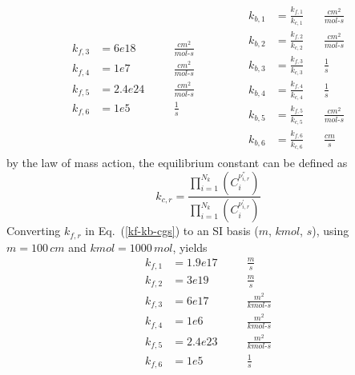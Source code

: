 \documentclass[a4paper]{report}
\newcommand{\eref}[1]{Eq.~(\ref{#1})}
\newcommand{\kf}[1]{k_{f,#1}}
\newcommand{\kb}[1]{k_{b,#1}}
\newcommand{\kcf}[1]{\frac{k_{f,#1}}{k_{c,#1}}}
\begin{document}
\begin{enumerate}
\begin{align}
\begin{alignedat}{2}
      \kf{3} &= 6e18   && \quad \frac{cm^2}{mol\text{-}s} \\
      \kf{4} &= 1e7    && \quad \frac{cm^2}{mol\text{-}s} \\
      \kf{5} &= 2.4e24 && \quad \frac{cm^2}{mol\text{-}s} \\
      \kf{6} &= 1e5    && \quad \frac{1}{s}
    \end{alignedat} \qquad\qquad
    \begin{alignedat}{2}
      \kb{1} &= \kcf{1} \, && \frac{cm^2}{mol\text{-}s} \\
      \kb{2} &= \kcf{2} \, && \frac{cm^2}{mol\text{-}s} \\
      \kb{3} &= \kcf{3} \, && \frac{1}{s} \\
      \kb{4} &= \kcf{4} \, && \frac{1}{s} \\
      \kb{5} &= \kcf{5} \, && \frac{cm^2}{mol\text{-}s} \\
      \kb{6} &= \kcf{6} \, && \frac{cm}{s}
    \end{alignedat}
    \label{kf-kb-cgs}
  \end{align}
  by the law of mass action, the equilibrium constant can be defined as
  \begin{equation}
    k_{c,r} = \frac{\prod_{i=1}^{N_k}(C_i^{\nu_{i,r}^{''}})}
    {\prod_{i=1}^{N_k}(C_i^{\nu_{i,r}^{'}})}
    \label{kc-def}
  \end{equation}
  Converting $\kf{r}$ in \eref{kf-kb-cgs} to an SI basis ($m$, $kmol$, $s$),
  using $m = 100\, cm$ and $kmol = 1000\, mol$, yields
  \begin{equation}
    \begin{alignedat}{2}
      \kf{1} &= 1.9e17 && \quad \frac{m}{s} \\
      \kf{2} &= 3e19   && \quad \frac{m}{s} \\
      \kf{3} &= 6e17   && \quad \frac{m^2}{kmol\text{-}s} \\
      \kf{4} &= 1e6    && \quad \frac{m^2}{kmol\text{-}s} \\
      \kf{5} &= 2.4e23 && \quad \frac{m^2}{kmol\text{-}s} \\
      \kf{6} &= 1e5    && \quad \frac{1}{s}
    \end{alignedat}
  \end{equation}
\end{enumerate}
\end{document}
